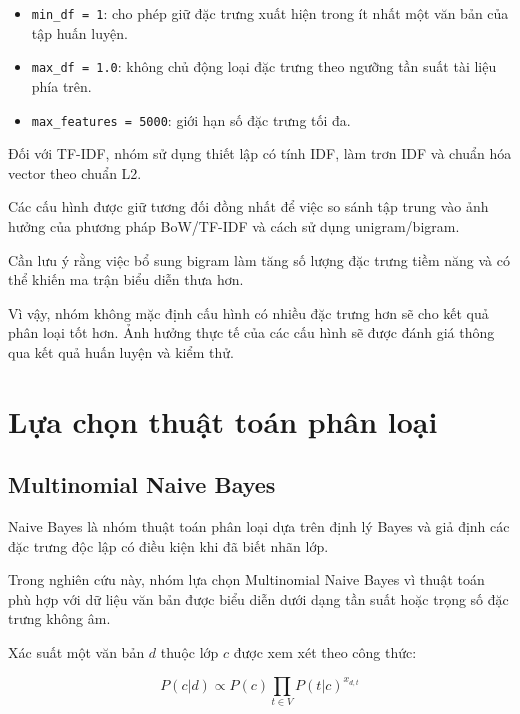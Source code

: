 \begin{itemize}
    \item \texttt{min\_df = 1}: cho phép giữ đặc trưng xuất hiện trong ít nhất một văn bản của tập huấn luyện.

    \item \texttt{max\_df = 1.0}: không chủ động loại đặc trưng theo ngưỡng tần suất tài liệu phía trên.

    \item \texttt{max\_features = 5000}: giới hạn số đặc trưng tối đa.
\end{itemize}

Đối với TF-IDF, nhóm sử dụng thiết lập có tính IDF, làm trơn IDF và chuẩn hóa vector theo chuẩn L2.

Các cấu hình được giữ tương đối đồng nhất để việc so sánh tập trung vào ảnh hưởng của phương pháp BoW/TF-IDF và cách sử dụng unigram/bigram.

Cần lưu ý rằng việc bổ sung bigram làm tăng số lượng đặc trưng tiềm năng và có thể khiến ma trận biểu diễn thưa hơn.

Vì vậy, nhóm không mặc định cấu hình có nhiều đặc trưng hơn sẽ cho kết quả phân loại tốt hơn. Ảnh hưởng thực tế của các cấu hình sẽ được đánh giá thông qua kết quả huấn luyện và kiểm thử.



\section{Lựa chọn thuật toán phân loại}

\subsection{Multinomial Naive Bayes}

Naive Bayes là nhóm thuật toán phân loại dựa trên định lý Bayes và giả định các đặc trưng độc lập có điều kiện khi đã biết nhãn lớp.

Trong nghiên cứu này, nhóm lựa chọn Multinomial Naive Bayes vì thuật toán phù hợp với dữ liệu văn bản được biểu diễn dưới dạng tần suất hoặc trọng số đặc trưng không âm.

Xác suất một văn bản $d$ thuộc lớp $c$ được xem xét theo công thức:

\begin{equation}
P(c|d)
\propto
P(c)
\prod_{t \in V}
P(t|c)^{x_{d,t}}
\end{equation}

